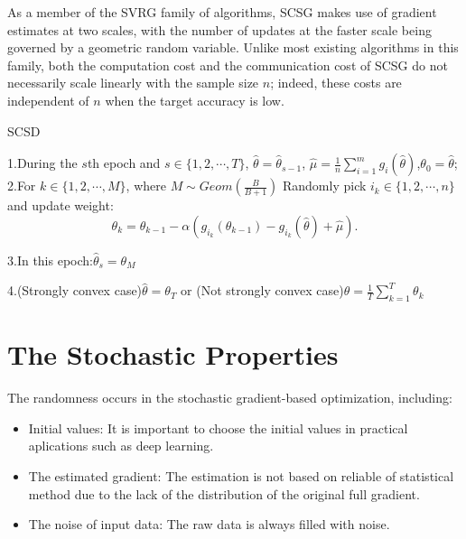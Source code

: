 \documentclass[11pt]{article} %
\begin{document}
As a member of the SVRG family of algorithms,
SCSG makes use of gradient estimates at two scales,
with the number of updates at the faster scale being governed by a geometric random variable.
Unlike most existing algorithms in this family, both the computation cost
and the communication cost of SCSG do not necessarily scale linearly with the
sample size $n$; indeed, these costs are independent of $n$ when the target accuracy is low.
\begin{algorithm} %
\caption{SCSD} %
\label{SCSD} %
1.During the $s$th epoch and $s\in \{ 1, 2, \cdots, T\}$, $\hat{\theta}={\hat{\theta}}_{s-1}$, $\hat{\mu}=\frac{1}{n}\sum_{i=1}^{m} g_i (\hat{\theta})$,${\theta}_0=\hat{\theta}$;
2.For $k\in \{ 1, 2, \cdots, M\}$, where $M \sim Geom(\frac{B}{B+1})$
  Randomly pick $i_k \in \{1,2,\cdots, n\}$ and update weight:
 $${\theta}_k={\theta}_{k-1}-\alpha(g_{i_k}({\theta}_{k-1})-g_{i_k}(\hat{\theta})+\hat{\mu}).$$

3.In this epoch:${\hat{\theta}}_{s}={\theta}_M$

4.(Strongly convex case)${\hat{\theta}}={\theta}_T$ or (Not strongly convex case)${\hat{\theta}}= \frac{1}{T}\sum _{k=1}^{T}{\theta}_k $
\end{algorithm}

\section{The Stochastic Properties}
The randomness occurs in the stochastic gradient-based optimization, including:
\begin{itemize}
         \item Initial values: It is important to choose the initial values in practical aplications such as deep learning.
         \item The estimated gradient: The estimation is not based on reliable of statistical method due to the lack of the distribution of the  original full gradient.
         \item The noise of input data: The raw data is always filled with noise.
\end{itemize}
\end{document}
